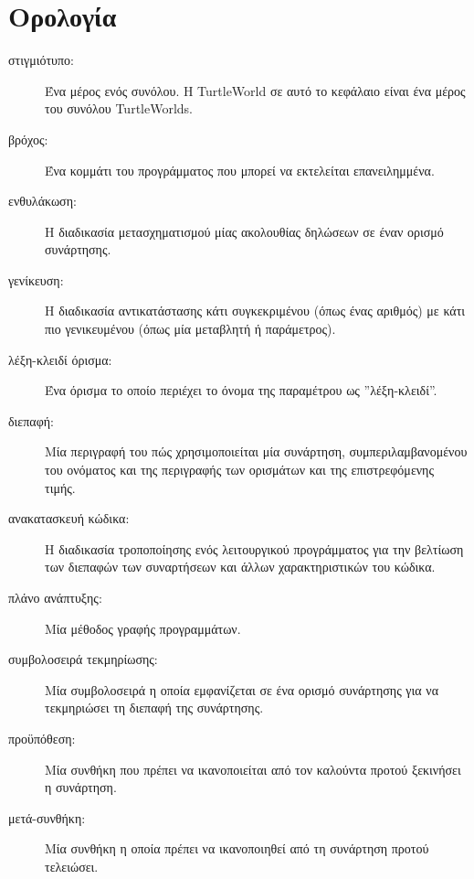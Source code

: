 \documentclass[10pt]{book}
\begin{document}
\section{Ορολογία}

\begin{description}

\item[στιγμιότυπο:] Ένα μέρος ενός συνόλου. Η TurtleWorld σε αυτό το κεφάλαιο
είναι ένα μέρος του συνόλου TurtleWorlds.


\item[βρόχος:] Ένα κομμάτι του προγράμματος που μπορεί να εκτελείται επανειλημμένα.

\item[ενθυλάκωση:] Η διαδικασία μετασχηματισμού μίας ακολουθίας δηλώσεων σε έναν ορισμό συνάρτησης.

\item[γενίκευση:] Η διαδικασία αντικατάστασης κάτι συγκεκριμένου 
(όπως ένας αριθμός) με κάτι πιο γενικευμένου (όπως μία μεταβλητή ή παράμετρος).

\item[λέξη-κλειδί όρισμα:] Ένα όρισμα το οποίο περιέχει το όνομα της παραμέτρου ως ''λέξη-κλειδί''.

\item[διεπαφή:] Μία περιγραφή του πώς χρησιμοποιείται μία συνάρτηση, συμπεριλαμβανομένου του
ονόματος και της περιγραφής των ορισμάτων και της επιστρεφόμενης τιμής.

\item[ανακατασκευή κώδικα:] Η διαδικασία τροποποίησης ενός λειτουργικού προγράμματος για την βελτίωση των 
διεπαφών των συναρτήσεων και άλλων χαρακτηριστικών του κώδικα.

\item[πλάνο ανάπτυξης:] Μία μέθοδος γραφής προγραμμάτων.

\item[συμβολοσειρά τεκμηρίωσης:] Μία συμβολοσειρά η οποία εμφανίζεται σε ένα ορισμό συνάρτησης
για να τεκμηριώσει τη διεπαφή της συνάρτησης.

\item[προϋπόθεση:] Μία συνθήκη που πρέπει να ικανοποιείται από τον καλούντα προτού ξεκινήσει η συνάρτηση.

\item[μετά-συνθήκη:] Μία συνθήκη η οποία πρέπει να ικανοποιηθεί από τη συνάρτηση προτού
τελειώσει.

\end{description}
\end{document}
